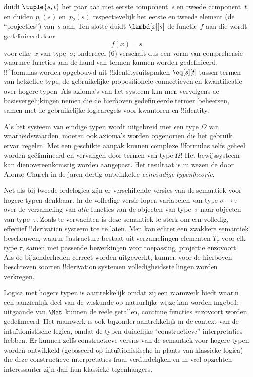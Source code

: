 \documentclass[openany]{memoir}
\begin{document}
duidt $\tuple{s, t}$ het paar aan met eerste component~$s$ en tweede
component~$t$, en duiden $p_1(s)$ en~$p_2(s)$ respectievelijk het eerste en
tweede element (de ``projecties'') van~$s$ aan. Ten slotte duidt
$\lambd[x][s]$ de functie~$f$ aan die wordt gedefinieerd door
\[
f(x) = s
\]
voor elke~$x$ van type~$\sigma$; onderdeel (6) verschaft dus een vorm van
comprehensie waarmee functies aan de hand van termen kunnen worden
gedefinieerd. !!^{formula}s worden opgebouwd uit !!{identity}suitspraken
$\eq[s][t]$ tussen termen van hetzelfde type, de gebruikelijke
propositionele connectieven en kwantificatie over hogere typen. Als axioma's
van het systeem kan men vervolgens de basisvergelijkingen nemen die de
hierboven gedefinieerde termen beheersen, samen met de gebruikelijke
logicaregels voor kwantoren en !!{identity}.

Als het systeem van eindige typen wordt uitgebreid met een type $\Omega$ van
waarheidswaarden, moeten ook axioma's worden opgenomen die het gebruik ervan
regelen. Met een geschikte aanpak kunnen complexe !!{formula}s zelfs geheel
worden geëlimineerd en vervangen door termen van type $\Omega$!{} Het
bewijssysteem kan dienovereenkomstig worden aangepast. Het resultaat is in
wezen de door Alonzo Church in de jaren dertig ontwikkelde
\emph{eenvoudige typentheorie}.

Net als bij tweede-ordelogica zijn er verschillende versies van de semantiek
voor hogere typen denkbaar. In de volledige versie lopen variabelen van type
$\sigma \to \tau$ over de verzameling van
\emph{alle} functies van de objecten van type~$\sigma$ naar objecten van
type~$\tau$. Zoals te verwachten is deze semantiek te sterk om een volledig,
effectief !!{derivation} systeem toe te laten. Men kan echter een zwakkere
semantiek beschouwen, waarin !!a{structure} bestaat uit verzamelingen elementen
$T_\tau$ voor elk type $\tau$, samen met passende bewerkingen voor toepassing,
projectie enzovoort. Als de bijzonderheden correct worden uitgewerkt, kunnen
voor de hierboven beschreven soorten !!{derivation} systemen
volledigheidsstellingen worden verkregen.

Logica met hogere typen is aantrekkelijk omdat zij een raamwerk biedt waarin
een aanzienlijk deel van de wiskunde op natuurlijke wijze kan worden
ingebed: uitgaande van $\Nat$ kunnen de reële getallen, continue functies
enzovoort worden gedefinieerd. Het raamwerk is ook bijzonder aantrekkelijk in
de context van de intuïtionistische logica, omdat de typen duidelijke
``constructieve'' interpretaties hebben. Er kunnen zelfs constructieve versies
van de semantiek voor hogere typen worden ontwikkeld (gebaseerd op
intuïtionistische in plaats van klassieke logica) die deze constructieve
interpretaties fraai verduidelijken en in veel opzichten interessanter zijn
dan hun klassieke tegenhangers.
\endgroup
\end{document}
